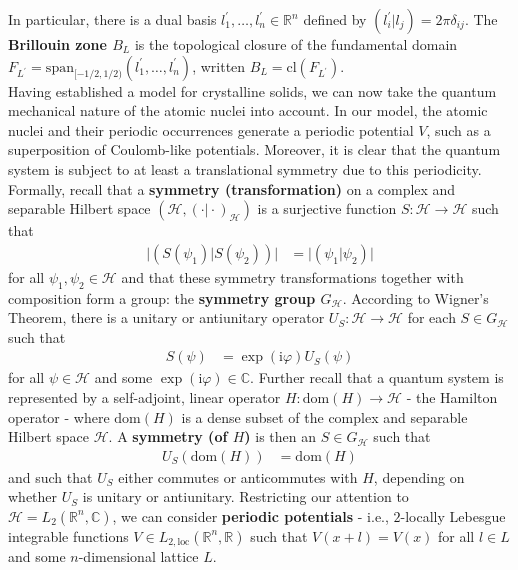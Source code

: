In particular, there is a dual basis $l_{1}^{\prime},\ldots,l_{n}^{\prime} \in \mathbb{R}^{n}$ defined by $(l_{i}^{\prime} \vert l_{j}) = 2\pi\delta_{ij}$.
The \textbf{Brillouin zone $B_{L}$} is the topological closure of the fundamental domain $F_{{L}^{\prime}} = \mathrm{span}_{[-1/2,1/2)}(l_{1}^{\prime},\ldots,l_{n}^{\prime})$, written $B_{L} = \mathrm{cl}(F_{L^{\prime}})$.
\\
Having established a model for crystalline solids, we can now take the quantum mechanical nature of the atomic nuclei into account.
In our model, the atomic nuclei and their periodic occurrences generate a periodic potential $V$, such as a superposition of Coulomb-like potentials.
Moreover, it is clear that the quantum system is subject to at least a translational symmetry due to this periodicity.
\\
Formally, recall that a \textbf{symmetry (transformation)} on a complex and separable Hilbert space $(\mathcal{H},(\cdot \vert \cdot)_{\mathcal{H}})$ is a surjective function $S \colon \mathcal{H} \to \mathcal{H}$ such that
\begin{align*}
  \vert
    (S(\psi_{1}) \vert S(\psi_{2}))
  \vert
  &=
  \vert
    (\psi_{1} \vert \psi_{2})
  \vert
\end{align*}
for all $\psi_{1},\psi_{2} \in \mathcal{H}$ and that these symmetry transformations together with composition form a group: the \textbf{symmetry group $G_{\mathcal{H}}$}.
According to Wigner's Theorem, there is a unitary or antiunitary operator $U_{S} \colon \mathcal{H} \to \mathcal{H}$ for each $S \in G_{\mathcal{H}}$ such that
\begin{align*}
  S(\psi)
  &=
  \exp(\mathrm{i}\varphi) U_{S}(\psi)
\end{align*}
for all $\psi \in \mathcal{H}$ and some $\exp(\mathrm{i}\varphi) \in \mathbb{C}$.
Further recall that a quantum system is represented by a self-adjoint, linear operator $H \colon \mathrm{dom}(H) \to \mathcal{H}$ - the Hamilton operator - where $\mathrm{dom}(H)$ is a dense subset of the complex and separable Hilbert space $\mathcal{H}$.
A \textbf{symmetry (of $H$)} is then an $S \in G_{\mathcal{H}}$ such that
\begin{align*}
  U_{S}(\mathrm{dom}(H))
  &=
  \mathrm{dom}(H)
\end{align*}
and such that $U_{S}$ either commutes or anticommutes with $H$, depending on whether $U_{S}$ is unitary or antiunitary.
Restricting our attention to $\mathcal{H} = L_{2}(\mathbb{R}^{n},\mathbb{C})$, we can consider \textbf{periodic potentials} - i.e., $2$-locally Lebesgue integrable functions $V \in L_{2,\textrm{loc}}(\mathbb{R}^{n},\mathbb{R})$ such that $V(x + l) = V(x)$ for all $l \in L$ and some $n$-dimensional lattice $L$.
